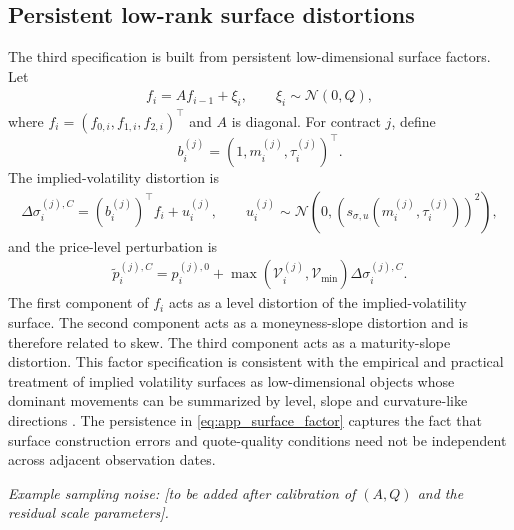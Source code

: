 \documentclass[11pt,a4paper,notitlepage]{article}
\numberwithin{equation}{section}
\begin{document}
\subsection{Persistent low-rank surface distortions}
The third specification is built from persistent low-dimensional surface factors. Let
\begin{align}
f_i=A f_{i-1}+\xi_i,
\qquad
\xi_i\sim\mathcal{N}(0,Q),
\label{eq:app_surface_factor}
\end{align}
where $f_i=(f_{0,i},f_{1,i},f_{2,i})^\top$ and $A$ is diagonal. For contract $j$, define
\[
b_i^{(j)}=(1,m_i^{(j)},\tau_i^{(j)})^\top.
\]
The implied-volatility distortion is
\begin{align}
\Delta\sigma_i^{(j),C}
=
\left(b_i^{(j)}\right)^\top f_i + u_i^{(j)},
\qquad
u_i^{(j)}\sim\mathcal{N}\left(0,\left(s_{\sigma,u}(m_i^{(j)},\tau_i^{(j)})\right)^2\right),
\label{eq:app_factor_iv_noise}
\end{align}
and the price-level perturbation is
\begin{align}
\tilde p_i^{(j),C}
=
p_i^{(j),0}
+
\max\left(\mathcal{V}_i^{(j)},\mathcal{V}_{\min}\right)
\Delta\sigma_i^{(j),C}.
\label{eq:app_factor_price_noise}
\end{align}
The first component of $f_i$ acts as a level distortion of the implied-volatility surface. The second component
acts as a moneyness-slope distortion and is therefore related to skew. The third component acts as a maturity-slope
distortion. This factor specification is consistent with the empirical and practical treatment of implied volatility
surfaces as low-dimensional objects whose dominant movements can be summarized by level, slope and curvature-like
directions \citep{cont2002dynamics}. The persistence in \eqref{eq:app_surface_factor} captures the fact that surface
construction errors and quote-quality conditions need not be independent across adjacent observation dates.

\emph{Example sampling noise: [to be added after calibration of $(A,Q)$ and the residual scale parameters].}
\end{document}
